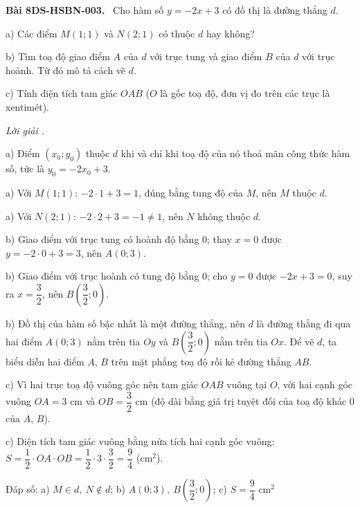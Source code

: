 \documentclass[12pt,a4paper]{article}
\newenvironment{problem}[1][]{\par\medskip\noindent\textbf{Bài #1.}\ }{\par}
\newenvironment{solution}[1][]{\par\noindent\textit{Lời giải #1.}\par}{\par}
\begin{document}
\begin{problem}[8DS-HSBN-003]
Cho hàm số $y = -2x + 3$ có đồ thị là đường thẳng $d$.

a) Các điểm $M(1; 1)$ và $N(2; 1)$ có thuộc $d$ hay không?

b) Tìm toạ độ giao điểm $A$ của $d$ với trục tung và giao điểm $B$ của $d$ với trục hoành. Từ đó mô tả cách vẽ $d$.

c) Tính diện tích tam giác $OAB$ ($O$ là gốc toạ độ, đơn vị đo trên các trục là xentimét).

\begin{solution}
a) Điểm $(x_0; y_0)$ thuộc $d$ khi và chỉ khi toạ độ của nó thoả mãn công thức hàm số, tức là $y_0 = -2x_0 + 3$.

a) Với $M(1; 1)$: $-2 \cdot 1 + 3 = 1$, đúng bằng tung độ của $M$, nên $M$ thuộc $d$.

a) Với $N(2; 1)$: $-2 \cdot 2 + 3 = -1 \neq 1$, nên $N$ không thuộc $d$.

b) Giao điểm với trục tung có hoành độ bằng $0$; thay $x = 0$ được $y = -2 \cdot 0 + 3 = 3$, nên $A(0; 3)$.

b) Giao điểm với trục hoành có tung độ bằng $0$; cho $y = 0$ được $-2x + 3 = 0$, suy ra $x = \dfrac{3}{2}$, nên $B\left(\dfrac{3}{2}; 0\right)$.

b) Đồ thị của hàm số bậc nhất là một đường thẳng, nên $d$ là đường thẳng đi qua hai điểm $A(0; 3)$ nằm trên tia $Oy$ và $B\left(\dfrac{3}{2}; 0\right)$ nằm trên tia $Ox$. Để vẽ $d$, ta biểu diễn hai điểm $A$, $B$ trên mặt phẳng toạ độ rồi kẻ đường thẳng $AB$.

c) Vì hai trục toạ độ vuông góc nên tam giác $OAB$ vuông tại $O$, với hai cạnh góc vuông $OA = 3$ cm và $OB = \dfrac{3}{2}$ cm (độ dài bằng giá trị tuyệt đối của toạ độ khác $0$ của $A$, $B$).

c) Diện tích tam giác vuông bằng nửa tích hai cạnh góc vuông: $S = \dfrac{1}{2} \cdot OA \cdot OB = \dfrac{1}{2} \cdot 3 \cdot \dfrac{3}{2} = \dfrac{9}{4}$ (cm$^2$).

Đáp số: a) $\boxed{M \in d,\ N \notin d}$; b) $\boxed{A(0; 3),\ B\left(\dfrac{3}{2}; 0\right)}$; c) $\boxed{S = \dfrac{9}{4} \text{ cm}^2}$
\end{solution}
\end{problem}
\end{document}
